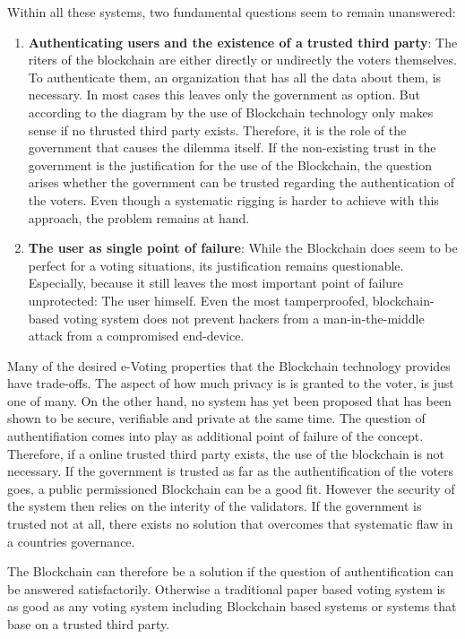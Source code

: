 Within all these systems, two fundamental questions seem to remain unanswered:
\begin{enumerate}
	\item \textbf{Authenticating users and the existence of a trusted third party}:	The riters of the blockchain are either directly or undirectly the voters themselves. To authenticate them, an organization that has all the data about them, is necessary. In most cases this leaves only the government as option. But according to the diagram by  \citeauthor{Wust2017} the use of Blockchain technology only makes sense if no thrusted third party exists. Therefore, it is the role of the government that causes the dilemma itself. If the non-existing trust in the government is the justification for the use of the Blockchain, the question arises whether the government can be trusted regarding the authentication of the voters. Even though a systematic rigging is harder to achieve with this approach, the problem remains at hand. 
	\item \textbf{The user as single point of failure}: While the Blockchain does seem to be perfect for a voting situations, its justification remains questionable. Especially, because it still leaves the most important point of failure unprotected: The user himself. Even the most tamperproofed, blockchain-based voting system does not prevent hackers from a man-in-the-middle attack from a compromised end-device. 
\end{enumerate}

Many of the desired e-Voting properties that the Blockchain technology provides have trade-offs. The aspect of how much privacy is is granted to the voter, is just one of many. On the other hand, no system has yet been proposed that has been shown to be secure, verifiable and private at the same time. The question of authentifiation comes into play as additional point of failure of the concept.
Therefore, if a online trusted third party exists, the use of the blockchain is not necessary. If the government is trusted as far as the authentification of the voters goes, a public permissioned Blockchain can be a good fit. However the security of the system then relies on the interity of the validators. 
If the government is trusted not at all, there exists no solution that overcomes that systematic flaw in a countries governance.

The Blockchain can therefore be a solution if the question of authentification can be answered satisfactorily. Otherwise a traditional paper based voting system is as good as any voting system including Blockchain based systems or systems that base on a trusted third party.










